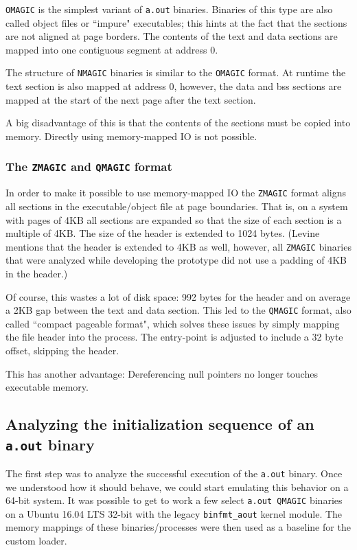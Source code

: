 \documentclass{article}
\begin{document}
\texttt{OMAGIC} is the simplest variant of \texttt{a.out} binaries. Binaries of this type are also called object files or ``impure" executables; this hints at the fact that the sections are not aligned at page borders. The contents of the text and data sections are mapped into one contiguous segment at address 0.

The structure of \texttt{NMAGIC} binaries is similar to the \texttt{OMAGIC} format. At runtime the text section is also mapped at address 0, however, the data and bss sections are mapped at the start of the next page after the text section.

A big disadvantage of this is that the contents of the sections must be copied into memory. Directly using memory-mapped IO is not possible.

\subsubsection{The \texttt{ZMAGIC} and \texttt{QMAGIC} format}
\label{formatdesc_zqmagic}

In order to make it possible to use memory-mapped IO the \texttt{ZMAGIC} format aligns all sections in the executable/object file at page boundaries.\cite[page 53]{Levine} That is, on a system with pages of 4KB all sections are expanded so that the size of each section is a multiple of 4KB. The size of the header is extended to 1024 bytes. (Levine mentions that the header is extended to 4KB as well, however, all \texttt{ZMAGIC} binaries that were analyzed while developing the prototype did not use a padding of 4KB in the header.) 

Of course, this wastes a lot of disk space: 992 bytes for the header and on average a 2KB gap between the text and data section. This led to the \texttt{QMAGIC} format, also called ``compact pageable format"\cite[page 53]{Levine}, which solves these issues by simply mapping the file header into the process. The entry-point is adjusted to include a 32 byte offset, skipping the header.

This has another advantage: Dereferencing null pointers no longer touches executable memory.

\subsection{Analyzing the initialization sequence of an \texttt{a.out} binary}

The first step was to analyze the successful execution of the \texttt{a.out} binary. Once we understood how it should behave, we could start emulating this behavior on a 64-bit system. It was possible to get to work a few select \texttt{a.out QMAGIC} binaries on a Ubuntu 16.04 LTS 32-bit with the legacy \texttt{binfmt\_aout} kernel module. The memory mappings of these binaries/processes were then used as a baseline for the custom loader.
\end{document}
